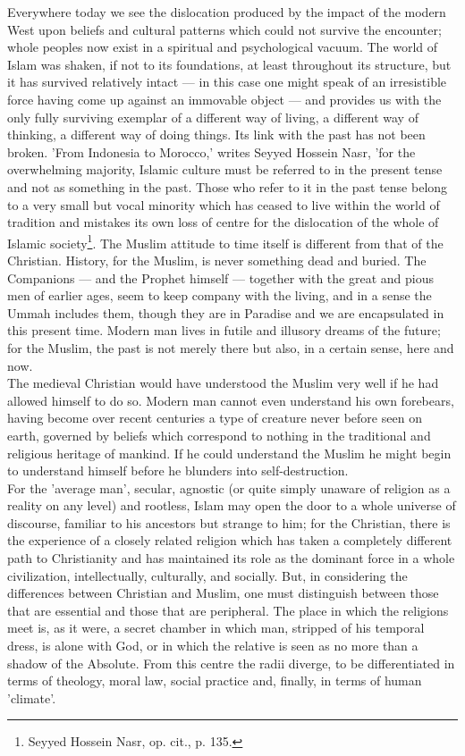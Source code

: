 \documentclass[11pt, b5paper, twoside]{book}
\begin{document}
Everywhere today we see the dislocation produced by the impact of the modern West upon beliefs and cultural patterns which could not survive the encounter; whole peoples now exist in a spiritual and psychological vacuum. The world of Islam was shaken, if not to its foundations, at least throughout its structure, but it has survived relatively intact --- in this case one might speak of an irresistible force having come up against an immovable object --- and provides us with the only fully surviving exemplar of a different way of living, a different way of thinking, a different way of doing things. Its link with the past has not been broken. 'From Indonesia to Morocco,' writes Seyyed Hossein Nasr, 'for the overwhelming majority, Islamic culture must be referred to in the present tense and not as something in the past. Those who refer to it in the past tense belong to a very small but vocal minority which has ceased to live within the world of tradition and mistakes its own loss of centre for the dislocation of the whole of Islamic society\footnote{Seyyed Hossein Nasr, op. cit., p. 135.}. The Muslim attitude to time itself is different from that of the Christian. History, for the Muslim, is never something dead and buried. The Companions --- and the Prophet himself --- together with the great and pious men of earlier ages, seem to keep company with the living, and in a sense the Ummah includes them, though they are in Paradise and we are encapsulated in this present time. Modern man lives in futile and illusory dreams of the future; for the Muslim, the past is not merely there but also, in a certain sense, here and now. \\

The medieval Christian would have understood the Muslim very well if he had allowed himself to do so. Modern man cannot even understand his own forebears, having become over recent centuries a type of creature never before seen on earth, governed by beliefs which correspond to nothing in the traditional and religious heritage of mankind. If he could understand the Muslim he might begin to understand himself before he blunders into self-destruction. \\

For the 'average man', secular, agnostic (or quite simply unaware of religion as a reality on any level) and rootless, Islam may open the door to a whole universe of discourse, familiar to his ancestors but strange to him; for the Christian, there is the experience of a closely related religion which has taken a completely different path to Christianity and has maintained its role as the dominant force in a whole civilization, intellectually, culturally, and socially. But, in considering the differences between Christian and Muslim, one must distinguish between those that are essential and those that are peripheral. The place in which the religions meet is, as it were, a secret chamber in which man, stripped of his temporal dress, is alone with God, or in which the relative is seen as no more than a shadow of the Absolute. From this centre the radii diverge, to be differentiated in terms of theology, moral law, social practice and, finally, in terms of human 'climate'. \\
\end{document}
